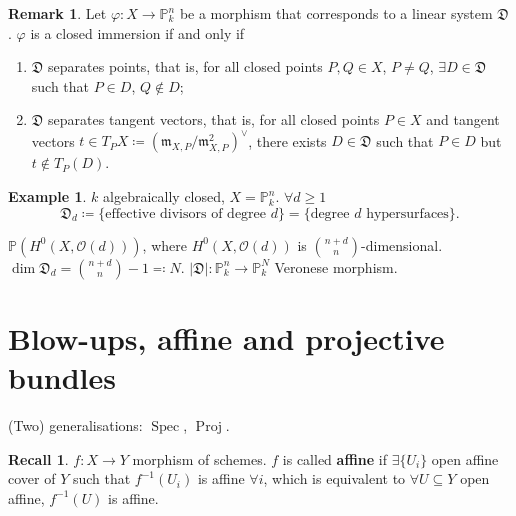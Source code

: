 \documentclass[12pt]{article}
\DeclareMathOperator{\Spec}{Spec}
\DeclareMathOperator{\Proj}{Proj}
\theoremstyle{definition}
\newtheorem*{remark}{Remark}
\newtheorem*{recall}{Recall}
\newtheorem*{example}{Example}
\theoremstyle{remark}
\newtheorem*{comment}{Comment}
\begin{document}
\begin{remark}
Let $\varphi:X\rightarrow\mathbb{P}_k^n$ be a morphism that corresponds to a linear system $\mathfrak{D}$. $\varphi$ is a closed immersion if and only if
\begin{enumerate}[label=\arabic*)]
\item $\mathfrak{D}$ separates points, that is, for all closed points $P,Q\in X$, $P\neq Q$, $\exists D\in\mathfrak{D}$ such that $P\in D$, $Q\notin D$;
\item $\mathfrak{D}$ separates tangent vectors, that is, for all closed points $P\in X$ and tangent vectors $t\in T_PX\coloneqq(\mathfrak{m}_{X,P}/\mathfrak{m}_{X,P}^2)^{\vee}$, there exists $D\in\mathfrak{D}$ such that $P\in D$ but $t\notin T_P(D)$.
\end{enumerate}
\end{remark}

\begin{comment}
This tells us that it is a closed immersion when, given two points, there is a line that goes through one of them and not through the other one; and that given a point and a vector, there exists a line or quadric that goes through the point with a different tangent vector.
\end{comment}

\begin{example}
$k$ algebraically closed, $X=\mathbb{P}_k^n$. $\forall d\geq1$
\[\mathfrak{D}_d\coloneqq\{\text{effective divisors of degree }d\}=\{\text{degree }d\text{ hypersurfaces}\}.\]

$\mathbb{P}(H^0(X,\mathcal{O}(d)))$, where $H^0(X,\mathcal{O}(d))$ is $\binom{n+d}{n}$-dimensional. $\dim\mathfrak{D}_d=\binom{n+d}{n}-1\eqqcolon N$. $|\mathfrak{D}|:\mathbb{P}_k^n\rightarrow\mathbb{P}_k^N$ Veronese morphism.
\end{example}

\section{Blow-ups, affine and projective bundles}
(Two) generalisations: $\Spec$, $\Proj$.

\begin{recall}
$f:X\rightarrow Y$ morphism of schemes. $f$ is called \textbf{affine} if $\exists\{U_i\}$ open affine cover of $Y$ such that $f^{-1}(U_i)$ is affine $\forall i$, which is equivalent to $\forall U\subseteq Y$ open affine, $f^{-1}(U)$ is affine.
\end{recall}
\end{document}
